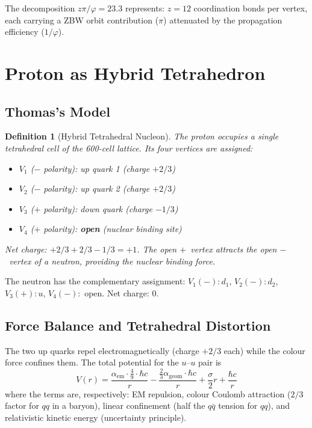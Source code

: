 \documentclass[12pt,a4paper]{article}
\newtheorem{definition}{Definition}
\begin{document}
The decomposition $z\pi/\varphi = 23.3$ represents: $z = 12$ coordination bonds per vertex, each carrying a ZBW orbit contribution ($\pi$) attenuated by the propagation efficiency ($1/\varphi$).

\section{Proton as Hybrid Tetrahedron}
\label{sec:proton}

\subsection{Thomas's Model}

\begin{definition}[Hybrid Tetrahedral Nucleon]
The proton occupies a single tetrahedral cell of the 600-cell lattice. Its four vertices are assigned:
\begin{itemize}
\item $V_1$ ($-$ polarity): up quark 1 (charge $+2/3$)
\item $V_2$ ($-$ polarity): up quark 2 (charge $+2/3$)
\item $V_3$ ($+$ polarity): down quark (charge $-1/3$)
\item $V_4$ ($+$ polarity): \textbf{open} (nuclear binding site)
\end{itemize}
Net charge: $+2/3 + 2/3 - 1/3 = +1$. The open $+$~vertex attracts the open $-$~vertex of a neutron, providing the nuclear binding force.
\end{definition}

The neutron has the complementary assignment: $V_1(-): d_1$, $V_2(-): d_2$, $V_3(+): u$, $V_4(-):$ open. Net charge: $0$.

\subsection{Force Balance and Tetrahedral Distortion}

The two up quarks repel electromagnetically (charge $+2/3$ each) while the colour force confines them. The total potential for the $u$--$u$ pair is
\begin{equation}
V(r) = \frac{\alpha_{\mathrm{em}} \cdot \frac{4}{9} \cdot \hbar c}{r} - \frac{\frac{2}{3}\alpha_{\mathrm{geom}} \cdot \hbar c}{r} + \frac{\sigma}{2}r + \frac{\hbar c}{r}
\label{eq:potential}
\end{equation}
where the terms are, respectively: EM repulsion, colour Coulomb attraction ($2/3$ factor for $qq$ in a baryon), linear confinement (half the $q\bar{q}$ tension for $qq$), and relativistic kinetic energy (uncertainty principle).
\end{document}
